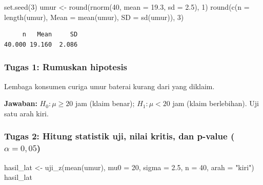 \documentclass[
  indonesian,
  letterpaper,
]{book}
\newenvironment{Shaded}{\begin{snugshade}}{\end{snugshade}}
\newcommand{\AttributeTok}[1]{\textcolor[rgb]{0.40,0.45,0.13}{#1}}
\newcommand{\DecValTok}[1]{\textcolor[rgb]{0.68,0.00,0.00}{#1}}
\newcommand{\FloatTok}[1]{\textcolor[rgb]{0.68,0.00,0.00}{#1}}
\newcommand{\FunctionTok}[1]{\textcolor[rgb]{0.28,0.35,0.67}{#1}}
\newcommand{\NormalTok}[1]{\textcolor[rgb]{0.00,0.23,0.31}{#1}}
\newcommand{\OtherTok}[1]{\textcolor[rgb]{0.00,0.23,0.31}{#1}}
\newcommand{\StringTok}[1]{\textcolor[rgb]{0.13,0.47,0.30}{#1}}
\begin{document}
\begin{Shaded}
\begin{Highlighting}[]
\FunctionTok{set.seed}\NormalTok{(}\DecValTok{3}\NormalTok{)}
\NormalTok{umur }\OtherTok{\textless{}{-}} \FunctionTok{round}\NormalTok{(}\FunctionTok{rnorm}\NormalTok{(}\DecValTok{40}\NormalTok{, }\AttributeTok{mean =} \FloatTok{19.3}\NormalTok{, }\AttributeTok{sd =} \FloatTok{2.5}\NormalTok{), }\DecValTok{1}\NormalTok{)}
\FunctionTok{round}\NormalTok{(}\FunctionTok{c}\NormalTok{(}\AttributeTok{n =} \FunctionTok{length}\NormalTok{(umur), }\AttributeTok{Mean =} \FunctionTok{mean}\NormalTok{(umur), }\AttributeTok{SD =} \FunctionTok{sd}\NormalTok{(umur)), }\DecValTok{3}\NormalTok{)}
\end{Highlighting}
\end{Shaded}

\begin{verbatim}
     n   Mean     SD 
40.000 19.160  2.086 
\end{verbatim}

\subsubsection{Tugas 1: Rumuskan
hipotesis}\label{tugas-1-rumuskan-hipotesis}

Lembaga konsumen curiga umur baterai kurang dari yang diklaim.

\textbf{Jawaban:} \(H_0: \mu \ge 20\) jam (klaim benar);
\(H_1: \mu < 20\) jam (klaim berlebihan). Uji satu arah kiri.

\subsubsection{\texorpdfstring{Tugas 2: Hitung statistik uji, nilai
kritis, dan p-value
(\(\alpha = 0{,}05\))}{Tugas 2: Hitung statistik uji, nilai kritis, dan p-value (\textbackslash alpha = 0\{,\}05)}}\label{tugas-2-hitung-statistik-uji-nilai-kritis-dan-p-value-alpha-005}

\begin{Shaded}
\begin{Highlighting}[]
\NormalTok{hasil\_lat }\OtherTok{\textless{}{-}} \FunctionTok{uji\_z}\NormalTok{(}\FunctionTok{mean}\NormalTok{(umur), }\AttributeTok{mu0 =} \DecValTok{20}\NormalTok{, }\AttributeTok{sigma =} \FloatTok{2.5}\NormalTok{, }\AttributeTok{n =} \DecValTok{40}\NormalTok{, }\AttributeTok{arah =} \StringTok{"kiri"}\NormalTok{)}
\NormalTok{hasil\_lat}
\end{Highlighting}
\end{Shaded}
\end{document}
